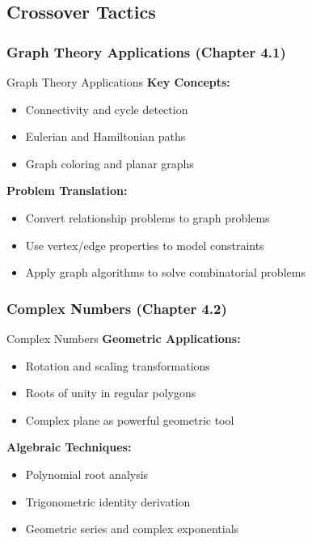 \documentclass[12pt]{article}
\begin{document}
	\subsection{Crossover Tactics}
	
	\subsubsection{Graph Theory Applications (Chapter 4.1)}
	
	\begin{tacticsbox}{Graph Theory Applications}
		\textbf{Key Concepts:}
		\begin{itemize}
			\item Connectivity and cycle detection
			\item Eulerian and Hamiltonian paths
			\item Graph coloring and planar graphs
		\end{itemize}
		
		\textbf{Problem Translation:}
		\begin{itemize}
			\item Convert relationship problems to graph problems
			\item Use vertex/edge properties to model constraints
			\item Apply graph algorithms to solve combinatorial problems
		\end{itemize}
	\end{tacticsbox}
	
	\subsubsection{Complex Numbers (Chapter 4.2)}
	
	\begin{tacticsbox}{Complex Numbers}
		\textbf{Geometric Applications:}
		\begin{itemize}
			\item Rotation and scaling transformations
			\item Roots of unity in regular polygons
			\item Complex plane as powerful geometric tool
		\end{itemize}
		
		\textbf{Algebraic Techniques:}
		\begin{itemize}
			\item Polynomial root analysis
			\item Trigonometric identity derivation
			\item Geometric series and complex exponentials
		\end{itemize}
	\end{tacticsbox}
	
\end{document}
